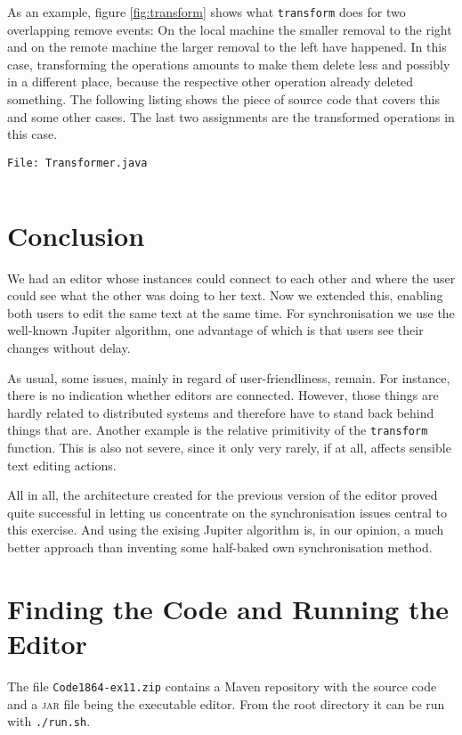 \documentclass[a4paper,draft,12pt,oneside,article,table]{memoir}
\newcommand{\srcpath}{../ex09/src/main/java/ddist}
\newcommand{\inmnt}[3]{\vspace{1em}\noindent\texttt{\color{gray}File: #3}\vspace{-1em}\inputminted[tabsize=4,firstline=#1,firstnumber=#1,lastline=#2,linenos]{java}{\srcpath/#3}}
\newcommand{\mil}[1]{\texttt{#1}}
\begin{document}
As an example, figure \ref{fig:transform} shows what \mil{transform}
does for two overlapping remove events: On the local machine the smaller
removal to the right and on the remote machine the larger removal to the
left have happened. In this case, transforming the operations amounts to
make them delete less and possibly in a different place, because the
respective other operation already deleted something. The following
listing shows the piece of source code that covers this and some other
cases. The last two assignments are the transformed operations in this
case.

\inmnt{149}{184}{Transformer.java}

\chapter{Conclusion}

We had an editor whose instances could connect to each other and where
the user could see what the other was doing to her text. Now we extended
this, enabling both users to edit the same text at the same time. For
synchronisation we use the well-known Jupiter algorithm, one advantage
of which is that users see their changes without delay.

As usual, some issues, mainly in regard of user-friendliness, remain.
For instance, there is no indication whether editors are connected.
However, those things are hardly related to distributed systems and
therefore have to stand back behind things that are. Another example is
the relative primitivity of the \mil{transform} function. This is also
not severe, since it only very rarely, if at all, affects sensible text
editing actions.

All in all, the architecture created for the previous version of the
editor proved quite successful in letting us concentrate on the
synchronisation issues central to this exercise. And using the exising
Jupiter algorithm is, in our opinion, a much better approach than
inventing some half-baked own synchronisation method.

\appendix

\chapter{Finding the Code and Running the Editor}

The file \texttt{Code1864-ex11.zip} contains a Maven repository with the source
code and a \textsc{jar} file being the executable editor. From the
root directory it can be run with \texttt{./run.sh}.


\setlength{\RaggedRightRightskip}{0pt plus 4em} %
\RaggedRight
{}
\printbibliography
\end{document}
